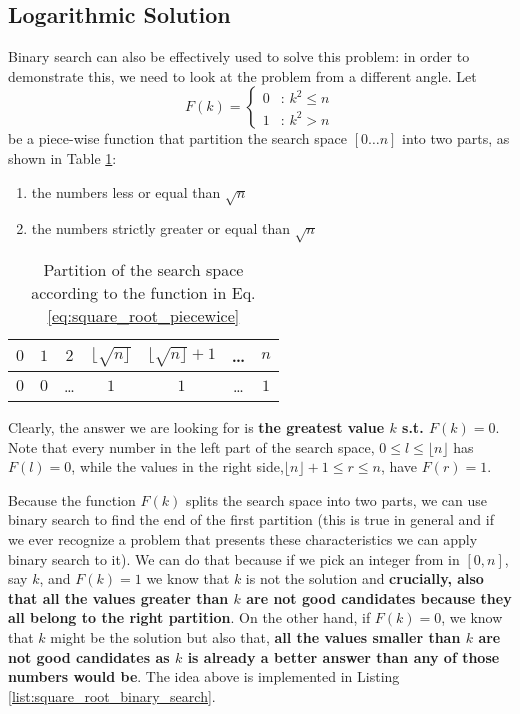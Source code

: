 \subsection{Logarithmic Solution}
Binary search can also be effectively used to solve this problem: in order to demonstrate this, we need
to look at the problem from a different angle. 
Let 
\begin{equation}
	F(k)=\begin{cases} 
	0 & \text{: } k^2 \leq n \\
	1 & \text{:  } k^2 > n
\end{cases}
\label{eq:square_root_piecewice}
\end{equation} 
be a piece-wise function that partition the search space $[0\ldots n]$ into two parts, as shown in Table
\ref{tab:sqrt_split_space}:
	\begin{enumerate}
      \item the numbers  less or equal than $\sqrt{n}$
      \item the numbers strictly greater or equal than $\sqrt{n}$
	\end{enumerate}


\begin{table}
	\centering
	\begin{tabular}{|c|c|c|c|c|c|c|}
		\hline
		$0$ & $1$ & $2$   & $\lfloor \sqrt{n \rfloor}$ & $\lfloor \sqrt{n \rfloor}+1$ & \ldots   & $n$ \\ \hline
		$0$ & $0$ & \ldots & $1$ & $1$ & \ldots & $1$   \\ \hline
	\end{tabular}
	\caption{Partition of the search space according to the function in Eq.
	\ref{eq:square_root_piecewice}}
	\label{tab:sqrt_split_space}
\end{table}

Clearly, the answer we are looking for is \textbf{the greatest value $k$ s.t. $F(k) = 0$}. 
Note that every number in the left part of the search space, $0 \leq l \leq \lfloor n \rfloor$ has $F(l) = 0$, while the values in the right side,$\lfloor n \rfloor +1 \leq r \leq n$, have $F(r) = 1$.

Because the function $F(k)$ splits the search space into two parts, we can use
binary search to find the end of the first partition (this is true in general and if we ever recognize a problem that presents these characteristics we can apply binary search to it). 
We can do that because if we pick an integer from in $[0,n]$, say $k$, and $F(k) = 1$ we know that $k$ is not the solution and \textbf{crucially, also that
all the values greater than $k$ are not good candidates because they all belong to the right partition}.
On the other hand, if $F(k) = 0$, we know that $k$ might be the solution but also that, \textbf{all the values smaller than $k$ are not good candidates as $k$ is already a better answer than any of those numbers would be}.
The idea above is implemented in Listing \ref{list:square_root_binary_search}. 

